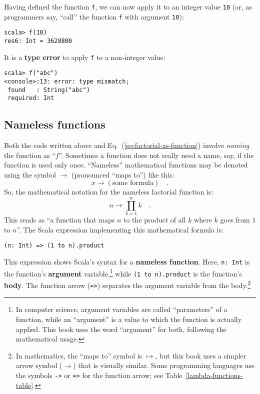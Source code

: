 Having defined the function \lstinline!f!, we can now apply it to
an integer value \lstinline!10! (or, as programmers say, \textsf{``}call\textsf{''}
the function \lstinline!f! with argument \lstinline!10!):
\begin{lstlisting}
scala> f(10)
res6: Int = 3628800
\end{lstlisting}
It is a \textbf{type error} to apply \lstinline!f!
to a non-integer value:
\begin{lstlisting}
scala> f("abc")
<console>:13: error: type mismatch;
 found   : String("abc")
 required: Int
\end{lstlisting}


\subsection{Nameless functions\label{subsec:Nameless-functions}}

Both the code written above and Eq.~(\ref{eq:factorial-as-function})
involve \emph{naming} the function as \textsf{``}$f$\textsf{''}. Sometimes a function
does not really need a name, \textemdash{} say, if the function is
used only once. \textsf{``}Nameless\textsf{''} mathematical functions may be denoted
using the symbol $\rightarrow$ (pronounced \textsf{``}maps to\textsf{''}) like this:
\[
x\rightarrow\left(\text{some formula}\right)\quad.
\]
So, the mathematical notation for the nameless factorial function
is:
\[
n\rightarrow\prod_{k=1}^{n}k\quad.
\]
This reads as \textsf{``}a function that maps $n$ to the product of all $k$
where $k$ goes from $1$ to $n$\textsf{''}. The Scala expression implementing
this mathematical formula is:
\begin{lstlisting}
(n: Int) => (1 to n).product
\end{lstlisting}
This expression shows Scala\textsf{'}s syntax for a \textbf{nameless function}.
Here, \lstinline!n: Int! is the function\textsf{'}s \textbf{argument} variable,\footnote{In computer science, argument variables are called \textsf{``}parameters\textsf{''}
of a function, while an \textsf{``}argument\textsf{''} is a value to which the function
is actually applied. This book uses the word \textsf{``}argument\textsf{''} for both,
following the mathematical usage.} while \lstinline!(1 to n).product! is the function\textsf{'}s \textbf{body}.
The function arrow (\lstinline!=>!) separates the argument variable
from the body.\footnote{In mathematics, the \textsf{``}maps to\textsf{''} symbol is $\mapsto$, but this book
uses a simpler arrow symbol ($\rightarrow$) that is visually similar.
Some programming languages use the symbols \lstinline!->! or \lstinline!=>!
for the function arrow; see Table~\ref{lambda-functions-table}.} 

